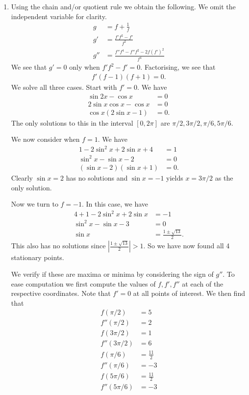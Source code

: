 \documentclass{article}
\begin{document}
\begin{enumerate}
    \item Using the chain and/or quotient rule we obtain the following. We omit the independent variable for clarity.
    \begin{align*}
        g &= f+\frac{1}{f} \\
        g' &= \frac{f'f^2-f'}{f^2} \\
        g'' &= \frac{f''f^4-f''f^2-2f(f')^2}{f^4}
    \end{align*}
    We see that \(g'=0\) only when \(f'f^2-f'=0\). Factorising, we see that
    \begin{align*}
        f'(f-1)(f+1)=0.
    \end{align*}
    We solve all three cases. Start with \(f'=0\). We have
    \begin{align*}
        \sin 2x - \cos x &= 0\\
        2\sin x \cos x - \cos x &= 0 \\
        \cos x (2 \sin x -1) &= 0.
    \end{align*}
    The only solutions to this in the interval \([0,2\pi]\) are \(\pi/2, 3\pi/2, \pi/6, 5\pi/6\). 
    
    We now consider when \(f=1\). We have
    \begin{align}
        1-2\sin^2 x+2\sin x+4&=1 \\
        \sin^2x - \sin x - 2 &= 0 \\
        (\sin x -2)(\sin x +1) &= 0.
    \end{align}
    Clearly \(\sin x =2\) has no solutions and \(\sin x =-1\) yields \(x=3\pi/2\) as the only solution.

    Now we turn to \(f=-1\). In this case, we have
    \begin{align*}
        4+1-2\sin^2x+2\sin x &= -1 \\
        \sin^2 x - \sin x - 3 &= 0 \\
        \sin x & = \frac{1\pm\sqrt{13}}{2}.
    \end{align*}
    This also has no solutions since \(|\frac{1\pm\sqrt{13}}{2}|>1\). So we have now found all 4 stationary points.

    We verify if these are maxima or minima by considering the sign of \(g''\). To ease computation we first compute the values of \(f, f', f''\) at each of the respective coordinates. Note that \(f'=0\) at all points of interest. We then find that
    \begin{align*}
        f(\pi/2) &= 5 \\
        f''(\pi/2) &= 2 \\
        f(3\pi/2) &= 1 \\
        f''(3\pi/2) &= 6 \\
        f(\pi/6) &= \frac{11}{2}\\
        f''(\pi/6) &= -3\\
        f(5\pi/6) &= \frac{11}{2} \\
        f''(5\pi/6) &= -3
    \end{align*}


\end{enumerate}
\end{document}
